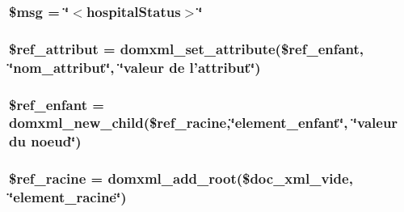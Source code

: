 \hypertarget{have_8php_a0}{
\subsubsection[\$msg]{\setlength{\rightskip}{0pt plus 5cm}\$msg = \char`\"{}$<$hospital\-Status$>$\char`\"{}}}
\label{have_8php_a0}


\hypertarget{have_8php_a5}{
\subsubsection[\$ref\_\-attribut]{\setlength{\rightskip}{0pt plus 5cm}\$ref\_\-attribut = domxml\_\-set\_\-attribute(\$ref\_\-enfant, \char`\"{}nom\_\-attribut\char`\"{}, \char`\"{}valeur de l'attribut\char`\"{})}}
\label{have_8php_a5}


\hypertarget{have_8php_a4}{
\subsubsection[\$ref\_\-enfant]{\setlength{\rightskip}{0pt plus 5cm}\$ref\_\-enfant = domxml\_\-new\_\-child(\$ref\_\-racine,\char`\"{}element\_\-enfant\char`\"{}, \char`\"{}valeur du noeud\char`\"{})}}
\label{have_8php_a4}


\hypertarget{have_8php_a3}{
\subsubsection[\$ref\_\-racine]{\setlength{\rightskip}{0pt plus 5cm}\$ref\_\-racine = domxml\_\-add\_\-root(\$doc\_\-xml\_\-vide, \char`\"{}element\_\-racine\char`\"{})}}
\label{have_8php_a3}


